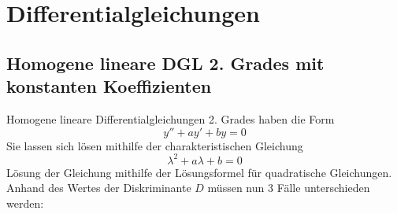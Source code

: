 \section{Differentialgleichungen} %
\label{sec:differentialgleichungen}

\subsection{Homogene lineare DGL 2. Grades mit konstanten Koeffizienten} %
Homogene lineare Differentialgleichungen 2. Grades haben die Form
\begin{equation}
	y'' + ay' + by = 0
\end{equation}
Sie lassen sich lösen mithilfe der charakteristischen Gleichung
\begin{equation}
	\lambda^2 + a\lambda + b = 0
\end{equation}
Lösung der Gleichung mithilfe der Lösungsformel für quadratische Gleichungen. Anhand des Wertes der Diskriminante $D$ 
müssen nun 3 Fälle unterschieden werden:
